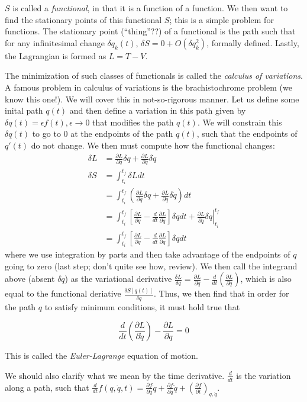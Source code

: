 \documentclass[10pt]{report}
\newcommand{\rd}[2]{\frac{d#1}{d#2}}
\newcommand{\pd}[2]{\frac{\partial #1}{\partial#2}}
\begin{document}
$S$ is called a \emph{functional}, in that it is a function of a function. We then want to find the stationary points of this functional $S$; this is a simple problem for functions. The stationary point (``thing''??) of a functional is the path such that for any infinitesimal change $\delta q_k(t)$, $\delta S = 0 + O(\delta q_k^2)$, formally defined. Lastly, the Lagrangian is formed as $L=T-V$. 

The minimization of such classes of functionals is called the \emph{calculus of variations}. A famous problem in calculus of variations is the brachistochrome problem (we know this one!). We will cover this in not-so-rigorous manner. Let us define some inital path $q(t)$ and then define a variation in this path given by $\delta q(t) = \epsilon f(t), \epsilon \to 0$ that modifies the path $q(t)$. We will constrain this $\delta q(t)$ to go to $0$ at the endpoints of the path $q(t)$, such that the endpoints of $q'(t)$ do not change. We then must compute how the functional changes: 
\begin{align*}
    \delta L &= \pd{L}{q}\delta q + \pd{L}{\dot{q}}\delta \dot{q}\\
    \delta S &= \int_{t_i}^{t_f} \delta L dt\\
    &= \int_{t_i}^{t_f} \left( \pd{L}{q}\delta q + \pd{L}{\dot{q}}\delta \dot{q} \right)dt\\
    &= \int_{t_i}^{t_f} \left[  \pd{L}{q} - \rd{}{t}\pd{L}{\dot{q}}\right]\delta q dt + \left.\pd{L}{\dot{q}}\delta q \right|_{t_i}^{t_f}\\
    &= \int_{t_i}^{t_f} \left[  \pd{L}{q} - \rd{}{t}\pd{L}{\dot{q}}\right]\delta q dt
\end{align*}
where we use integration by parts and then take advantage of the endpoints of $q$ going to zero (last step; don't quite see how, review). We then call the integrand above (absent $\delta q$) as the variational derivative $\frac{\delta L}{\delta q} = \pd{L}{q} - \rd{}{t}\left( \pd{L}{\dot{q}} \right)$, which is also equal to the functional deriative $\frac{\delta S[q(t)]}{\delta q}$. Thus, we then find that in order for the path $q$ to satisfy minimum conditions, it must hold true that 

$$\rd{}{t}\left( \pd{L}{\dot{q}} \right) - \pd{L}{q} = 0$$

This is called the \emph{Euler-Lagrange} equation of motion.

We should also clarify what we mean by the time derivative. $\rd{}{t}$ is the variation along a path, such that $\rd{}{t}f(q,\dot{q},t) = \pd{f}{q}\dot{q} + \pd{f}{\dot{q}}\ddot{q} + \left( \pd{f}{t} \right)_{q,\dot{q}}$. 
\end{document}
